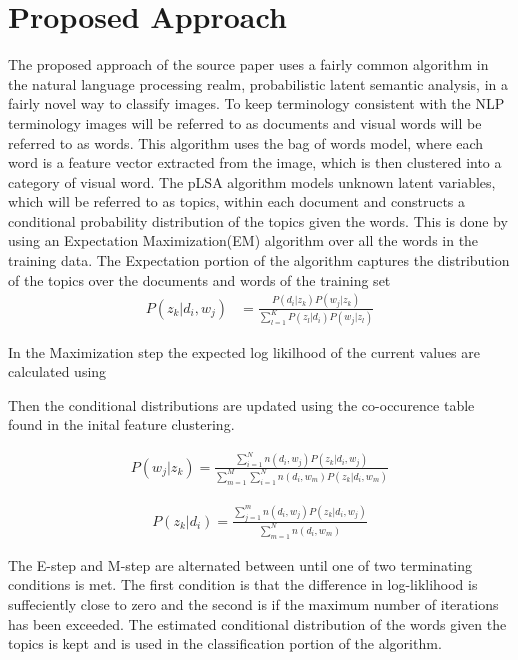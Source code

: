 \documentclass[conference]{IEEEtran}
\begin{document}
\section{Proposed Approach}

The proposed approach of the source paper uses a fairly common algorithm in the natural language processing realm, probabilistic latent semantic analysis, in a fairly novel way to classify images. To keep terminology consistent with the NLP terminology images will be referred to as documents and visual words will be referred to as words. This algorithm uses the bag of words model, where each word is a feature vector extracted from the image, which is then clustered into a category of visual word. The pLSA algorithm models unknown latent variables, which will be referred to as topics, within each document and constructs a conditional probability distribution of the topics given the words. This is done by using an Expectation Maximization(EM) algorithm over all the words in the training data. The Expectation portion of the algorithm captures the distribution of the topics over the documents and words of the training set
\begin{align*}
P(z_k|d_i, w_j) &= \frac{P(d_i|z_k)P(w_j|z_k)}{\sum_{l=1}^{K} P(z_l|d_i)P(w_j|z_l)}
\end{align*}

In the Maximization step the expected log likilhood of the current values are calculated using

Then the conditional distributions are updated using the co-occurence table found in the inital feature clustering.

\begin{align*}
P(w_j|z_k) = \frac{\sum_{i=1}^{N}n(d_i,w_j)P(z_k|d_i, w_j)}{\sum_{m=1}^{M}\sum_{i=1}^{N}n(d_i,w_m)P(z_k|d_i, w_m)}
\end{align*}

\begin{align*}
P(z_k|d_i) = \frac{\sum_{j=1}^{m}n(d_i,w_j)P(z_k|d_i, w_j)}{\sum_{m=1}^N n(d_i,w_m)}
\end{align*}

The E-step and M-step are alternated between until one of two terminating conditions is met. The first condition is that the difference in log-liklihood is suffeciently close to zero and the second is if the maximum number of iterations has been exceeded. The estimated conditional distribution of the words given the topics is kept and is used in the classification portion of the algorithm.\\
\end{document}
